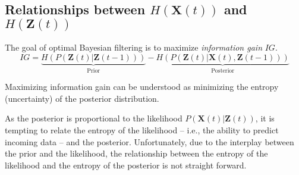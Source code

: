 \documentclass[12pt]{article}
\begin{document}
\subsection{Relationships between $H(\mathbf X(t))$ and $H(\mathbf Z(t))$}
The goal of optimal Bayesian filtering is to maximize \textit{information gain} $IG$. 
\begin{equation}
	\label{eqn:info_gain}
	IG = 
		\underbrace{H(P(\mathbf Z(t) | \mathbf Z(t-1)))}_{\text{Prior}}
		-
		\underbrace{H(P(\mathbf Z(t) | \mathbf X(t), \mathbf Z(t-1)))}_{\text{Posterior}}
\end{equation}

Maximizing information gain can be understood as minimizing the entropy (uncertainty) of the posterior distribution.

As the posterior is proportional to the likelihood $P(\mathbf X(t) | \mathbf Z(t))$, it is tempting to relate the entropy of the likelihood -- i.e., the ability to predict incoming data -- and the posterior. 
Unfortunately, due to the interplay between the prior and the likelihood, the relationship between the entropy of the likelihood and the entropy of the posterior is not straight forward. 
\end{document}
